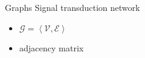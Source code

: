 \begin{frame}{Graphs}
\label{sec:graph}
Signal transduction network
\begin{itemize}
    \item $\mathcal{G} = \left< \mathcal{V}, \mathcal{E} \right>$
    \item adjacency matrix


\end{itemize}
\end{frame}
